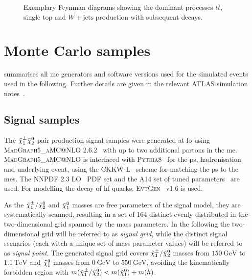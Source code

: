 \begin{figure}
\begin{subfigure}[b]{0.3\linewidth}
		\caption{\label{fig:wjets}}
	\end{subfigure}
	\caption{Exemplary Feynman diagrams showing the dominant processes  $t\bar{t}$,  single top and  $W+\textrm{jets}$ production with subsequent decays.}
	\label{fig:sm_backgrounds_feynman}
\end{figure}


\section{Monte Carlo samples}

 summarises all \gls{mc} generators and software versions used for the simulated events used in the following. Further details are given in the relevant ATLAS simulation notes~\cite{ATL-PHYS-PUB-2018-009,ATL-PHYS-PUB-2016-005,ATL-PHYS-PUB-2017-006,ATL-PHYS-PUB-2017-005,ATL-PHYS-PUB-2016-002}.

\subsection{Signal samples}

The $\tilde{\chi}_1^\pm\tilde{\chi}_2^0$ pair production signal samples were generated at \gls{lo} using \textsc{MadGraph5\_aMC@NLO} 2.6.2~\cite{MGaMCNLO:2014hca,Frederix:2012ps} with up to two additional partons in the \gls{me}. \textsc{MadGraph5\_aMC@NLO} is interfaced with \textsc{Pythia8}~\cite{Pythia8:2007gs} for the \gls{ps}, hadronisation and underlying event, using the CKKW-L~\cite{Lonnblad:2011xx} scheme for matching the \gls{ps} to the \glspl{me}. The NNPDF 2.3 LO~\cite{Ball:2012cx} \gls{PDF} set and the A14 set of tuned parameters~\cite{ATL-PHYS-PUB-2014-021} are used. For modelling the decay of \gls{hf} quarks, \textsc{EvtGen}~\cite{Lange:2001uf} v1.6 is used. 

As the $\tilde{\chi}_1^\pm/\tilde{\chi}_2^0$ and $\tilde{\chi}_1^0$ masses are free parameters of the signal model, they are systematically scanned, resulting in a set of 164 distinct evenly distributed in the two-dimensional grid spanned by the mass parameters. In the following the two-dimensional grid will be referred to as \textit{signal grid}, while the distinct signal scenarios (each witch a unique set of mass parameter values) will be referred to as \textit{signal point}. The generated signal grid covers $\tilde{\chi}_1^\pm/\tilde{\chi}_2^0$ masses from $\SI{150}{\GeV}$ to $\SI{1.1}{\TeV}$ and $\tilde{\chi}_1^0$ masses from $\SI{0}{\GeV}$ to $\SI{550}{\GeV}$, avoiding the kinematically forbidden region with $m(\tilde{\chi}_1^\pm/\tilde{\chi}_2^0) < m(\tilde{\chi}_1^0) + m(h)$.

